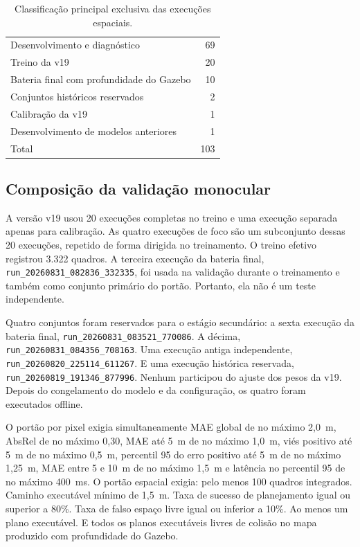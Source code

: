 \begin{table}[htb]
\centering
\caption{Classificação principal exclusiva das execuções espaciais.}
\label{tab:mono-composicao-espacial}
\begin{tabular}{lr}
\hline
Desenvolvimento e diagnóstico & 69 \\
Treino da v19 & 20 \\
Bateria final com profundidade do Gazebo & 10 \\
Conjuntos históricos reservados & 2 \\
Calibração da v19 & 1 \\
Desenvolvimento de modelos anteriores & 1 \\
Total & 103 \\
\hline
\end{tabular}
\end{table}

\subsection{Composição da validação monocular}

A versão v19 usou 20 execuções completas no treino e uma execução separada apenas para calibração. As quatro execuções de foco são um subconjunto dessas 20 execuções, repetido de forma dirigida no treinamento. O treino efetivo registrou 3.322 quadros. A terceira execução da bateria final, \texttt{run\_20260831\_082836\_332335}, foi usada na validação durante o treinamento e também como conjunto primário do portão. Portanto, ela não é um teste independente.

Quatro conjuntos foram reservados para o estágio secundário: a sexta execução da bateria final, \texttt{run\_20260831\_083521\_770086}. A décima, \texttt{run\_20260831\_084356\_708163}. Uma execução antiga independente, \texttt{run\_20260820\_225114\_611267}. E uma execução histórica reservada, \texttt{run\_20260819\_191346\_877996}. Nenhum participou do ajuste dos pesos da v19. Depois do congelamento do modelo e da configuração, os quatro foram executados offline.

O portão por pixel exigia simultaneamente MAE global de no máximo 2,0~m, AbsRel de no máximo 0,30, MAE até 5~m de no máximo 1,0~m, viés positivo até 5~m de no máximo 0,5~m, percentil 95 do erro positivo até 5~m de no máximo 1,25~m, MAE entre 5 e 10~m de no máximo 1,5~m e latência no percentil 95 de no máximo 400~ms. O portão espacial exigia: pelo menos 100 quadros integrados. Caminho executável mínimo de 1,5~m. Taxa de sucesso de planejamento igual ou superior a 80\%. Taxa de falso espaço livre igual ou inferior a 10\%. Ao menos um plano executável. E todos os planos executáveis livres de colisão no mapa produzido com profundidade do Gazebo.

